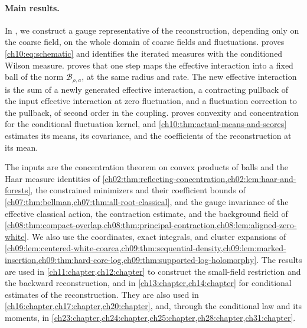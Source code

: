 \paragraph{Main results.}
In , we construct a gauge representative of the reconstruction, depending only on the coarse field, on the whole domain of coarse fields and fluctuations.  proves \eqref{ch10:eq:schematic} and identifies the iterated measures with the conditioned Wilson measure.  proves that one step maps the effective interaction into a fixed ball of the norm $\mathcal B_{\rho,a}$, at the same radius and rate. The new effective interaction is the sum of a newly generated effective interaction, a contracting pullback of the input effective interaction at zero fluctuation, and a fluctuation correction to the pullback, of second order in the coupling.  proves convexity and concentration for the conditional fluctuation kernel, and \cref{ch10:thm:actual-means-and-scores} estimates its means, its covariance, and the coefficients of the reconstruction at its mean.

The inputs are the concentration theorem on convex products of balls and the Haar measure identities of \cref{ch02:thm:reflecting-concentration,ch02:lem:haar-and-forests}, the constrained minimizers and their coefficient bounds of \cref{ch07:thm:bellman,ch07:thm:all-root-classical}, and the gauge invariance of the effective classical action, the contraction estimate, and the background field of \cref{ch08:thm:compact-overlap,ch08:thm:principal-contraction,ch08:lem:aligned-zero-white}. We also use the coordinates, exact integrals, and cluster expansions of \cref{ch09:lem:centered-white-coarea,ch09:thm:sequential-density,ch09:lem:marked-insertion,ch09:thm:hard-core-log,ch09:thm:supported-log-holomorphy}. The results are used in \cref{ch11:chapter,ch12:chapter} to construct the small-field restriction and the backward reconstruction, and in \cref{ch13:chapter,ch14:chapter} for conditional estimates of the reconstruction. They are also used in \cref{ch16:chapter,ch17:chapter,ch20:chapter}, and, through the conditional law and its moments, in \cref{ch23:chapter,ch24:chapter,ch25:chapter,ch28:chapter,ch31:chapter}.

